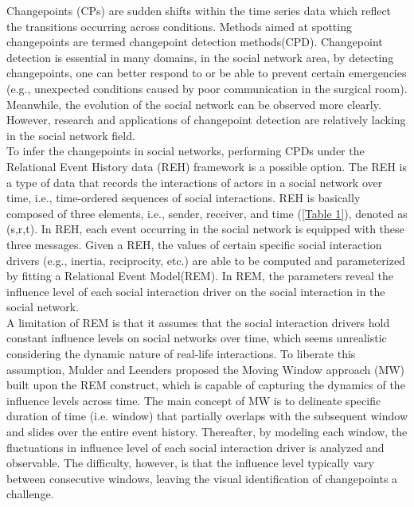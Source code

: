 \documentclass[]{interact}
\theoremstyle{plain}%
\theoremstyle{definition}
\theoremstyle{remark}
\begin{document}
\hspace{0.2cm} Changepoints (CPs) are sudden shifts within the time series data which reflect the transitions occurring across conditions\cite{sharmaTrendAnalysisChange2016}\cite{aminikhanghahiSurveyMethodsTime2017}. Methods aimed at spotting changepoints are termed changepoint detection methods(CPD). Changepoint detection is essential in many domains, in the social network area, by detecting changepoints, one can better respond to or be able to prevent certain emergencies (e.g., unexpected conditions caused by poor communication in the surgical room). Meanwhile, the evolution of the social network can be observed more clearly. However, research and applications of changepoint detection are relatively lacking in the social network field.\\

To infer the changepoints in social networks, performing CPDs under the Relational Event History data (REH) framework is a possible option. The REH is a type of data that records the interactions of actors in a social network over time, i.e., time-ordered sequences of social interactions\cite{meijerink-bosmanDynamicRelationalEvent2022}. REH is basically composed of three elements, i.e., sender, receiver, and time (\autoref{Table 1}), denoted as (s,r,t). In REH, each event occurring in the social network is equipped with these three messages. Given a REH, the values of certain specific social interaction drivers (e.g., inertia, reciprocity, etc.) are able to be computed and parameterized by fitting a Relational Event Model(REM). In REM, the parameters reveal the influence level of each social interaction driver on the social interaction in the social network.\\

A limitation of REM is that it assumes that the social interaction drivers hold constant influence levels on social networks over time, which seems unrealistic considering the dynamic nature of real-life interactions. To liberate this assumption, Mulder and Leenders \cite{mulderModelingEvolutionInteraction2019} proposed the Moving Window approach (MW) built upon the REM construct, which is capable of capturing the dynamics of the influence levels across time. The main concept of MW is to delineate specific duration of time (i.e. window) that partially overlaps with the subsequent window and slides over the entire event history. Thereafter, by modeling each window, the fluctuations in influence level of each social interaction driver is analyzed and observable. The difficulty, however, is that the influence level typically vary between consecutive windows, leaving the visual identification of changepoints a challenge.\\
\end{document}
